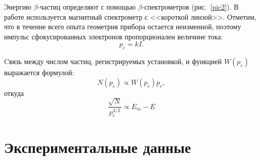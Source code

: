 \documentclass[a4paper,12pt]{article} %
\begin{document}
	Энергию $\beta$-частиц определяют с помощью $\beta$-спектрометров (рис.~\ref{pic2}). В работе используется магнитный спектрометр с <<короткой линзой>>. Отметим, что в течение всего опыта геометрия прибора остается неизменной, поэтому импульс сфокусированных электронов пропорционален величине тока:
	\begin{equation}
		\label{eq:pkI}
		\tag{$\star$}
		p_e = kI.
	\end{equation}

	Cвязь между числом частиц, регистрируемых установкой, и функцией $W(p_e)$ выражается формулой:
	\begin{equation*}
		N(p_e) \propto W(p_e)p_e,
	\end{equation*}
	откуда
	\begin{equation}
		\label{eq:fermi}
		\tag{$\star \star$}
		\frac{\sqrt{N}}{p_e^{3/2}} \propto E_m - E
	\end{equation}
	
	
	
	\newpage
	\section{Экспериментальные данные}
		
\end{document}
